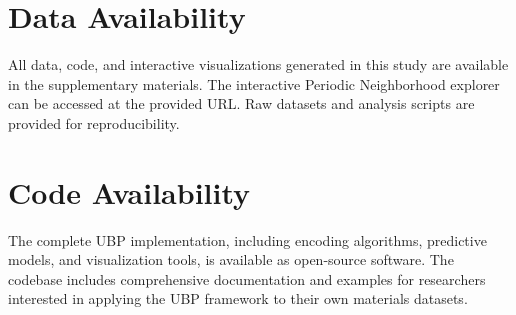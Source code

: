 \documentclass[12pt,a4paper]{article}
\begin{document}
\section*{Data Availability}

All data, code, and interactive visualizations generated in this study are available in the supplementary materials. The interactive Periodic Neighborhood explorer can be accessed at the provided URL. Raw datasets and analysis scripts are provided for reproducibility.

\section*{Code Availability}

The complete UBP implementation, including encoding algorithms, predictive models, and visualization tools, is available as open-source software. The codebase includes comprehensive documentation and examples for researchers interested in applying the UBP framework to their own materials datasets.
\end{document}
